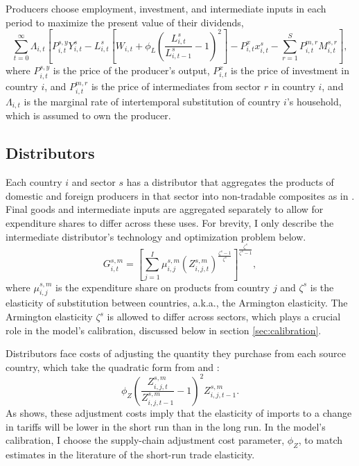 \documentclass[12pt]{article}
\begin{document}
Producers choose employment, investment, and intermediate inputs in each period to maximize the present value of their dividends,
\begin{equation}
    \sum_{t=0}^\infty \Lambda_{i,t} \left[P^{s,y}_{i,t} Y^s_{i,t}-L^s_{i,t}\left[W_{i,t}+ \phi_L \left(\frac{L^s_{i,t}}{L^s_{i,t-1}}-1\right)^2\right]- P^x_{i,t}x^s_{i,t}-\sum_{r=1}^S P^{m,r}_{i,t}M^{s,r}_{i,t}\right],
\end{equation}
where $P^{s,y}_{i,t}$ is the price of the producer's output, $P^x_{i,t}$ is the price of investment in country $i$, and $P^{m,r}_{i,t}$ is the price of intermediates from sector $r$ in country $i$, and $\Lambda_{i,t}$ is the marginal rate of intertemporal substitution of country $i$'s household, which is assumed to own the producer.

\subsection{Distributors}
Each country $i$ and sector $s$ has a distributor that aggregates the products of domestic and foreign producers in that sector into non-tradable composites as in \citet{armington1969theory}. Final goods and intermediate inputs are aggregated separately to allow for expenditure shares to differ across these uses. For brevity, I only describe the intermediate distributor's technology and optimization problem below.
\begin{equation}
    G^{s,m}_{i,t}=\left[\sum_{j=1}^I \mu^{s,m}_{i,j}(Z^{s,m}_{i,j,t})^{\frac{\zeta^{s}-1}{\zeta^{s}}}\right]^{\frac{\zeta^{s}}{\zeta^{s}-1}},
\end{equation}
where $\mu^{s,m}_{i,j}$ is the expenditure share on products from country $j$ and $\zeta^s$ is the elasticity of substitution between countries, a.k.a., the Armington elasticity. The Armington elasticity $\zeta^s$ is allowed to differ across sectors, which plays a crucial role in the model's calibration, discussed below in section \ref{sec:calibration}.

Distributors face costs of adjusting the quantity they purchase from each source country, which take the quadratic form from \citet{cje_nafta} and \citet{lt_restud}:
\begin{equation}
    \phi_Z \left(\frac{Z^{s,m}_{i,j,t}}{Z^{s,m}_{i,j,t-1}}-1\right)^2 Z^{s,m}_{i,j,t-1}.
\end{equation}
As \citet{cje_nafta} shows, these adjustment costs imply that the elasticity of imports to a change in tariffs will be lower in the short run than in the long run. In the model's calibration, I choose the supply-chain adjustment cost parameter, $\phi_Z$, to match estimates in the literature of the short-run trade elasticity.
\end{document}
